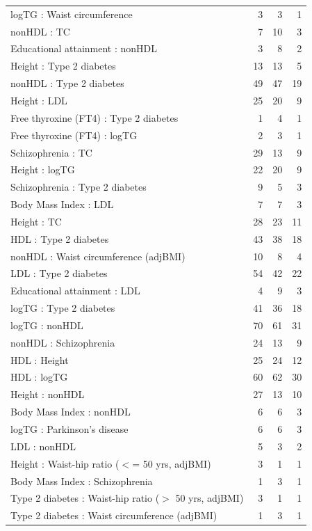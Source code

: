 \begin{table}[ht]
\begin{tabular}{lrrr}
  logTG : Waist circumference  &   3 &   3 &   1 \\ 
  nonHDL : TC &   7 &  10 &   3 \\ 
  Educational attainment : nonHDL &   3 &   8 &   2 \\ 
  Height  : Type 2 diabetes &  13 &  13 &   5 \\ 
  nonHDL : Type 2 diabetes &  49 &  47 &  19 \\ 
  Height  : LDL &  25 &  20 &   9 \\ 
  Free thyroxine (FT4) : Type 2 diabetes &   1 &   4 &   1 \\ 
  Free thyroxine (FT4) : logTG &   2 &   3 &   1 \\ 
  Schizophrenia : TC &  29 &  13 &   9 \\ 
  Height  : logTG &  22 &  20 &   9 \\ 
  Schizophrenia : Type 2 diabetes &   9 &   5 &   3 \\ 
  Body Mass Index  : LDL &   7 &   7 &   3 \\ 
  Height  : TC &  28 &  23 &  11 \\ 
  HDL : Type 2 diabetes &  43 &  38 &  18 \\ 
  nonHDL : Waist circumference (adjBMI) &  10 &   8 &   4 \\ 
  LDL : Type 2 diabetes &  54 &  42 &  22 \\ 
  Educational attainment : LDL &   4 &   9 &   3 \\ 
  logTG : Type 2 diabetes &  41 &  36 &  18 \\ 
  logTG : nonHDL &  70 &  61 &  31 \\ 
  nonHDL : Schizophrenia &  24 &  13 &   9 \\ 
  HDL : Height  &  25 &  24 &  12 \\ 
  HDL : logTG &  60 &  62 &  30 \\ 
  Height  : nonHDL &  27 &  13 &  10 \\ 
  Body Mass Index  : nonHDL &   6 &   6 &   3 \\ 
  logTG : Parkinson's disease &   6 &   6 &   3 \\ 
  LDL : nonHDL &   5 &   3 &   2 \\ 
  Height  : Waist-hip ratio ($<$= 50 yrs, adjBMI) &   3 &   1 &   1 \\ 
  Body Mass Index  : Schizophrenia &   1 &   3 &   1 \\ 
  Type 2 diabetes : Waist-hip ratio ($>$ 50 yrs, adjBMI) &   3 &   1 &   1 \\ 
  Type 2 diabetes : Waist circumference (adjBMI) &   1 &   3 &   1 \\ 

\end{tabular}
\end{table}
